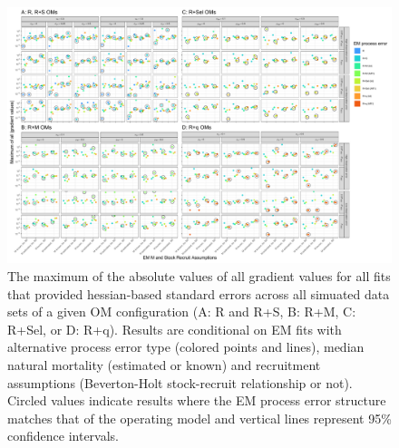 \documentclass[
  12pt,
]{article}
\begin{document}
\clearpage

\begin{landscape}
\begin{figure}
\begin{center}
\includegraphics{hess_grad_convergence_plots}
\end{center}
\caption{The maximum of the absolute values of all gradient values for all fits that provided hessian-based standard errors across all simuated data sets of a given OM configuration (A: R and R+S, B: R+M, C: R+Sel, or D: R+q).  Results are conditional on EM fits with alternative process error type (colored points and lines), median natural mortality (estimated or known) and recruitment assumptions (Beverton-Holt stock-recruit relationship or not). Circled values indicate results where the EM process error structure matches that of the operating model and vertical lines represent 95\% confidence intervals.}\label{hess_grad}
\end{figure}
\end{landscape}
\end{document}
